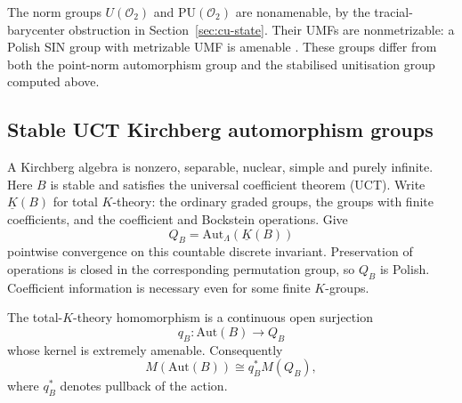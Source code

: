 \begin{remark}\label{rem:cu-remark-3}
The norm groups $U(\mathcal{O}_2)$ and $\mathrm{PU}(\mathcal{O}_2)$ are
nonamenable, by the tracial-barycenter obstruction in Section~\ref{sec:cu-state}. Their UMFs are nonmetrizable: a Polish SIN group with metrizable UMF is
amenable \cite[Corollary 3.4]{BYMT2017}. These groups differ from both the
point-norm automorphism group and the stabilised unitisation group computed
above.
\end{remark}


\subsection{Stable UCT Kirchberg automorphism groups}

\label{sec:cu-kirchberg}

A Kirchberg algebra is nonzero, separable, nuclear, simple and purely
infinite. Here $B$ is stable and satisfies the universal coefficient theorem
(UCT). Write $\underline K(B)$ for total $K$-theory: the ordinary graded
groups, the groups with finite coefficients, and the coefficient and
Bockstein operations. Give 
\begin{equation*}
Q_B=\mathrm{Aut}_\Lambda(\underline K(B))
\end{equation*}
pointwise convergence on this countable discrete invariant. Preservation of
operations is closed in the corresponding permutation group, so $Q_B$ is
Polish. Coefficient information is necessary even for some finite $K$-groups.

\begin{theorem}\label{thm:cu-stable-general}
 The total-$K$-theory homomorphism is a continuous
open surjection 
\begin{equation*}
q_B:\mathrm{Aut}(B)\longrightarrow Q_B
\end{equation*}
whose kernel is extremely amenable. Consequently 
\begin{equation*}
M(\mathrm{Aut}(B))\cong q_B^*M(Q_B),
\end{equation*}
where $q_B^*$ denotes pullback of the action.
\end{theorem}

